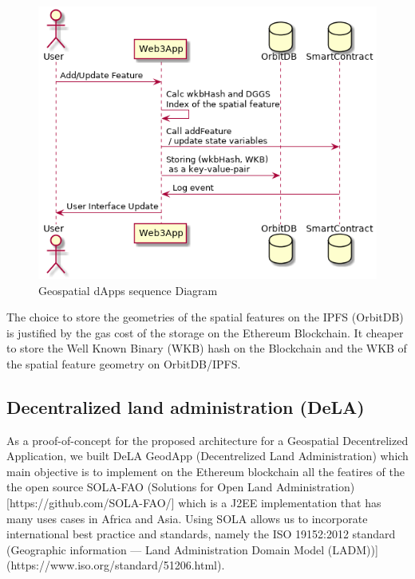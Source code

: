 \documentclass{isprs} %
\begin{document}
\begin{figure}[ht!]
\begin{center}
		\includegraphics[width=1.0\columnwidth]{figures/seq-geospatial-dapps.png}
	\caption{Geospatial dApps sequence Diagram}
\label{fig:figure_placement}
\end{center}
\end{figure}

The choice to store the geometries of the spatial features on the IPFS (OrbitDB) is justified by the gas cost of the storage on the Ethereum Blockchain. It cheaper to store the Well Known Binary (WKB) hash on the Blockchain and the WKB of the spatial feature geometry on OrbitDB/IPFS.

\subsection{Decentralized land administration (DeLA)}\label{sec:Decentralized land administration (DeLA)}

As a proof-of-concept for the proposed architecture for a Geospatial Decentrelized Application, we built DeLA GeodApp (Decentrelized Land Administration) which main objective is to implement on the Ethereum blockchain all the featires of the the open source SOLA-FAO (Solutions for Open Land Administration) [https://github.com/SOLA-FAO/] which is a J2EE implementation that has many uses cases in Africa and Asia. Using SOLA allows us to incorporate international best practice and standards, namely the ISO 19152:2012 standard (Geographic information — Land Administration Domain Model (LADM))](https://www.iso.org/standard/51206.html).
\end{document}
